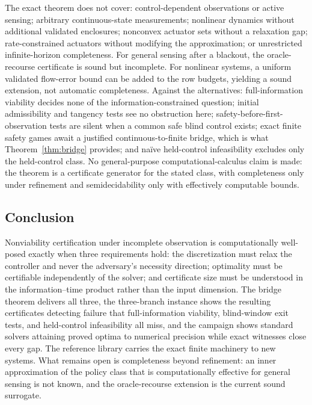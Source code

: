 \documentclass[10pt,twocolumn]{article}
\theoremstyle{plain}
\theoremstyle{definition}
\theoremstyle{remark}
\begin{document}
The exact theorem does not cover: control-dependent observations or active
sensing; arbitrary continuous-state measurements; nonlinear dynamics without
additional validated enclosures; nonconvex actuator sets without a
relaxation gap; rate-constrained actuators without modifying the
approximation; or unrestricted infinite-horizon completeness. For general
sensing after a blackout, the oracle-recourse certificate is sound but
incomplete. For nonlinear systems, a uniform validated flow-error bound can
be added to the row budgets, yielding a sound extension, not automatic
completeness. Against the alternatives: full-information viability decides
none of the information-constrained question; initial admissibility and
tangency tests see no obstruction here; safety-before-first-observation
tests are silent when a common safe blind control exists; exact finite
safety games await a justified continuous-to-finite bridge, which is what
Theorem~\ref{thm:bridge} provides; and na\"ive held-control infeasibility
excludes only the held-control class. No general-purpose
computational-calculus claim is made: the theorem is a certificate generator
for the stated class, with completeness only under refinement and
semidecidability only with effectively computable bounds.

\subsection{Conclusion}\label{conclusion}

Nonviability certification under incomplete observation is computationally
well-posed exactly when three requirements hold: the discretization must
relax the controller and never the adversary's necessity direction;
optimality must be certifiable independently of the solver; and certificate
size must be understood in the information--time product rather than the
input dimension. The bridge theorem delivers all three, the three-branch
instance shows the resulting certificates detecting failure that
full-information viability, blind-window exit tests, and held-control
infeasibility all miss, and the campaign shows standard solvers attaining
proved optima to numerical precision while exact witnesses close every gap.
The reference library carries the exact finite machinery to new systems.
What remains open is completeness beyond refinement: an inner
approximation of the policy class that is computationally effective for
general sensing is not known, and the oracle-recourse extension is the
current sound surrogate.
\end{document}
